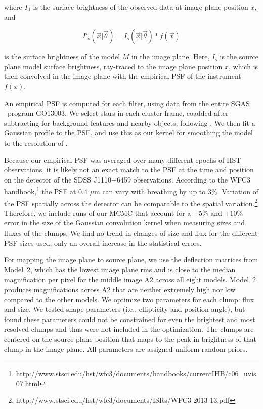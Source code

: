 \noindent where $I_\mathrm{d}$ is the surface brightness of the observed data at image plane position $x$, and 

\begin{equation}
I'_\mathrm{s}(\vec x | \vec\theta) = I_\mathrm{s}(\vec x | \vec\theta) \ast f(\vec x)
\end{equation}

\noindent is the surface brightness of the model $M$ in the image plane. Here, $I_\mathrm{s}$ is the source plane model surface brightness, ray-traced to the image plane position $x$, which is then convolved in the image plane with the empirical PSF of the instrument $f(x)$.

An empirical PSF is computed for each filter, using data from the entire SGAS \hst\ program GO13003. We select stars in each cluster frame, coadded after subtracting for background features and nearby objects, following \citet{Skelton:2014lr}. We then fit a Gaussian profile to the PSF, and use this as our kernel for smoothing the model to the resolution of \hst.

Because our empirical PSF was averaged over many different epochs of HST observations, it is likely not an exact match to the PSF at the time and position on the detector of the 
SDSS J1110+6459 observations.  According to the WFC3 handbook,\footnote{http://www.stsci.edu/hst/wfc3/documents/handbooks/currentIHB/c06\_uvis07.html} the PSF at 0.4 $\mu$m can vary with breathing by up to 3\%.  Variation of the PSF spatially across the detector can be comparable to the spatial variation.\footnote{http://www.stsci.edu/hst/wfc3/documents/ISRs/WFC3-2013-13.pdf} Therefore, we include runs of our MCMC that account for a $\pm5\%$ and $\pm10\%$ error in the size of the Gaussian convolution kernel when measuring sizes and fluxes of the clumps. We find no trend in changes of size and flux for the different PSF sizes used, only an overall increase in the statistical errors.

For mapping the image plane to source plane, we use the deflection matrices from Model~2, which has the lowest image plane rms and is close to the median magnification per pixel for the middle image A2 across all eight models. Model~2 produces magnifications across A2 that are neither extremely high nor low compared to the other models. We optimize two parameters for each clump: flux and size. We tested shape parameters (i.e., ellipticity and position angle), but found these parameters could not be constrained for even the brightest and most resolved clumps and thus were not included in the optimization. The clumps are centered on the source plane position that maps to the peak in brightness of that clump in the image plane.  All parameters are assigned uniform random priors.

